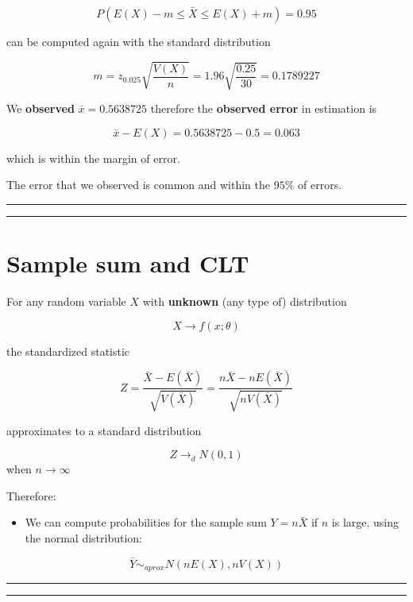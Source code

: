 \documentclass[
]{book}
\providecommand{\tightlist}{%
  \setlength{\itemsep}{0pt}\setlength{\parskip}{0pt}}
\begin{document}
\[P(E(X)-m \leq \bar{X} \leq E(X) + m)=0.95\]

can be computed again with the standard distribution

\[m=z_{0.025} \sqrt{\frac{V(X)}{n}}=1.96\sqrt{\frac{0.25}{30}}=0.1789227\]

We \textbf{observed} \(\bar{x}=0.5638725\) therefore the \textbf{observed error} in estimation is

\[\bar{x} - E(X)=0.5638725-0.5=0.063\]

which is within the margin of error.

The error that we observed is common and within the \(95\%\) of errors.

\begin{center}\rule{0.5\linewidth}{0.5pt}\end{center}

\begin{center}\rule{0.5\linewidth}{0.5pt}\end{center}

\hypertarget{sample-sum-and-clt}{%
\section{Sample sum and CLT}\label{sample-sum-and-clt}}

For any random variable \(X\) with \textbf{unknown} (any type of) distribution

\[X \rightarrow f(x; \theta)\]

the standardized statistic

\[Z=\frac{\bar{X}-E(\bar{X})}{\sqrt{V(\bar{X})}}=\frac{n\bar{X}-nE(\bar{X})}{\sqrt{nV(\bar{X})}}\]

approximates to a standard distribution

\[Z \rightarrow_d N(0,1)\] when \(n\rightarrow \infty\)

Therefore:

\begin{itemize}
\tightlist
\item
  We can compute probabilities for the sample sum \(Y=n\bar{X}\) if \(n\) is large, using the normal distribution:
\end{itemize}

\[\bar{Y} \sim_{aprox}  N(nE(X), nV(X))\]

\begin{center}\rule{0.5\linewidth}{0.5pt}\end{center}

\begin{center}\rule{0.5\linewidth}{0.5pt}\end{center}
\end{document}
